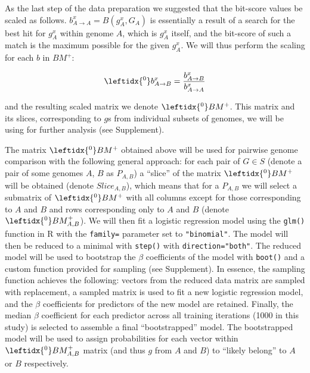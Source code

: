 As the last step of the data preparation we suggested that the bit-score values
be scaled as follows. $b_{A \rightarrow A}^x = B(g_A^x, G_A)$ is essentially a
result of a search for the best hit for $g_A^x$ within genome $A$, which is
$g_A^x$ itself, and the bit-score of such a match is the maximum possible for
the given $g_A^x$. We will thus perform the scaling for each $b$ in $BM^+$:

\begin{equation}
\leftidx{^0}b_{A \rightarrow B}^x = \dfrac{b_{A \rightarrow B}^x}{b_{A \rightarrow
A}^x}
\end{equation}

\newcommand{\bmzp}{\leftidx{^0}BM^+}

and the resulting scaled matrix we denote $\leftidx{^0}BM^+$. This matrix and
its slices, corresponding to $g$s from individual subsets of genomes, we will
be using for further analysis (see Supplement).

The matrix $\bmzp{}$ obtained above will be used for pairwise genome
comparison with the following general approach:
for each pair of $G \in S$ (denote a pair of some genomes $A$, $B$ as
$P_{A,B}$) a ``slice'' of the matrix $\bmzp{}$
will be obtained (denote $Slice_{A,B}$), which means that for a $P_{A,B}$ we
will select a submatrix of $\bmzp{}$ with all columns except for those
corresponding to $A$ and $B$ and rows corresponding only to $A$ and $B$ (denote
$\leftidx{^0}BM_{A,B}^+$).
\newcommand{\bmzpab}{\leftidx{^0}BM_{A,B}^+}
We will then fit a logistic regression model using the {\tt glm{()}} function
in R with the {\tt family=} parameter set to {\tt "binomial"}. The model will
then be reduced to a minimal with {\tt step()} with {\tt direction="both"}. The
reduced model will be used to bootstrap the $\beta$ coefficients of the model
with {\tt boot()} and a custom function provided for sampling (see Supplement).
In essence, the sampling function achieves the following: vectors from the
reduced data matrix are sampled with replacement, a sampled matrix is used to
fit a new logistic regression model, and the $\beta$ coefficients for
predictors of the new model are retained. Finally, the median $\beta$
coefficient for each predictor across all training iterations (1000 in this
study) is selected to assemble a final ``bootstrapped''
model. The bootstrapped model will be used to assign probabilities for each
vector within $\bmzpab$ matrix (and thus $g$ from $A$ and $B$) to ``likely
belong'' to $A$ or $B$ respectively.

